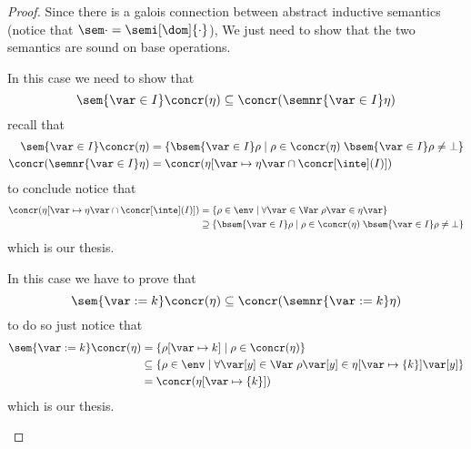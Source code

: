 \begin{proof}
  Since there is a galois connection between abstract inductive
  semantics (notice that \(\sem\cdot = \semi[\dom]{\cdot}\)), We just
  need to show that the two semantics are sound on base operations.

  \begin{inductive}
     In this case we need to show that
    \begin{equation*}
      \sem{\var\in I}\concr(\eta) \subseteq \concr(\semnr{\var \in I}\eta)
    \end{equation*}
    recall that
    \begin{align*}
      \sem{\var\in I}\concr(\eta) & = \{\bsem{\var\in I}\rho \mid \rho \in \concr(\eta) \; \bsem{\var\in I}\rho \neq \bot\} \\
      \concr(\semnr{\var\in I}\eta) & = \concr(\eta[\var\mapsto\eta\var\cap\concr[\inte](I)]) 
    \end{align*}
    to conclude notice that
    \begin{align*}
      \concr(\eta[\var\mapsto\eta\var\cap\concr[\inte](I)]) & = \{\rho \in \env \mid \forall \var\in\Var \; \rho\var\in\eta\var\} \\
                                                            & \supseteq \{\bsem{\var\in I}\rho \mid \rho \in \concr(\eta) \; \bsem{\var\in I}\rho \neq \bot\}
    \end{align*}
    which is our thesis.

     In this case we have to prove that
    \begin{equation*}
      \sem{\var := k}\concr(\eta) \subseteq \concr(\semnr{\var := k}\eta)
    \end{equation*}
    to do so just notice that
    \begin{align*}
      \sem{\var := k}\concr(\eta) & = \{\rho[\var\mapsto k] \mid \rho \in \concr(\eta)\} \\
                                  & \subseteq \{\rho \in \env \mid \forall \var[y] \in \Var \; \rho\var[y] \in \eta[\var\mapsto \{k\}]\var[y]\} \\
                                  & = \concr(\eta[\var\mapsto \{k\}])
    \end{align*}
    which is our thesis.


\end{inductive}
\end{proof}
